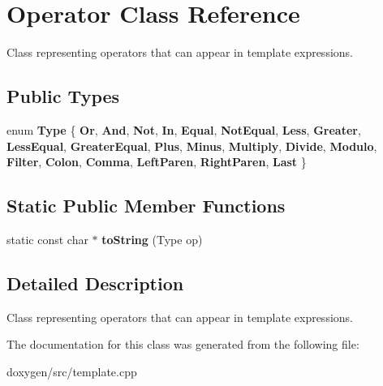 \hypertarget{class_operator}{}\section{Operator Class Reference}
\label{class_operator}


Class representing operators that can appear in template expressions.  


\subsection*{Public Types}
\begin{DoxyCompactItemize}
\item 
\mbox{\label{class_operator_adf562143104191264da67b4e6e1a1644}} 
enum {\bfseries Type} \{ \newline
{\bfseries Or}, 
{\bfseries And}, 
{\bfseries Not}, 
{\bfseries In}, 
\newline
{\bfseries Equal}, 
{\bfseries Not\+Equal}, 
{\bfseries Less}, 
{\bfseries Greater}, 
\newline
{\bfseries Less\+Equal}, 
{\bfseries Greater\+Equal}, 
{\bfseries Plus}, 
{\bfseries Minus}, 
\newline
{\bfseries Multiply}, 
{\bfseries Divide}, 
{\bfseries Modulo}, 
{\bfseries Filter}, 
\newline
{\bfseries Colon}, 
{\bfseries Comma}, 
{\bfseries Left\+Paren}, 
{\bfseries Right\+Paren}, 
\newline
{\bfseries Last}
 \}
\end{DoxyCompactItemize}
\subsection*{Static Public Member Functions}
\begin{DoxyCompactItemize}
\item 
\mbox{\label{class_operator_a30a56db9e007e273b7ccc49913519366}} 
static const char $\ast$ {\bfseries to\+String} (Type op)
\end{DoxyCompactItemize}


\subsection{Detailed Description}
Class representing operators that can appear in template expressions. 

The documentation for this class was generated from the following file\+:\begin{DoxyCompactItemize}
\item 
doxygen/src/template.\+cpp\end{DoxyCompactItemize}
